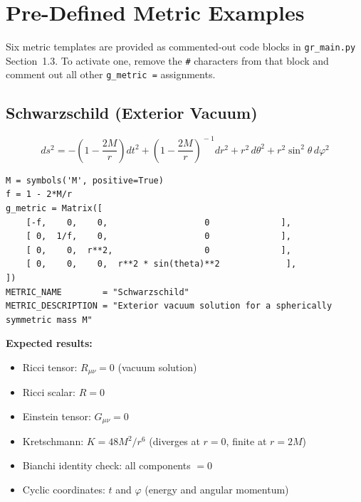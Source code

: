 \documentclass[11pt,a4paper]{article}
\newcommand{\code}[1]{\texttt{\small#1}}
\begin{document}
\section{Pre-Defined Metric Examples}
\label{sec:metrics}

Six metric templates are provided as commented-out code blocks in
\code{gr\_main.py} Section~1.3.  To activate one, remove the \code{\#}
characters from that block and comment out all other \code{g\_metric =}
assignments.

\subsection{Schwarzschild (Exterior Vacuum)}
\label{sec:m-schwarz}

\[
  ds^2 = -\!\left(1-\frac{2M}{r}\right)dt^2
         + \left(1-\frac{2M}{r}\right)^{\!-1}dr^2
         + r^2\,d\theta^2 + r^2\sin^2\!\theta\,d\varphi^2
\]

\begin{lstlisting}
M = symbols('M', positive=True)
f = 1 - 2*M/r
g_metric = Matrix([
    [-f,    0,    0,                   0              ],
    [ 0,  1/f,    0,                   0              ],
    [ 0,    0,  r**2,                  0              ],
    [ 0,    0,    0,  r**2 * sin(theta)**2             ],
])
METRIC_NAME        = "Schwarzschild"
METRIC_DESCRIPTION = "Exterior vacuum solution for a spherically symmetric mass M"
\end{lstlisting}

\textbf{Expected results:}
\begin{itemize}
  \item Ricci tensor: $R_{\mu\nu} = 0$ (vacuum solution)
  \item Ricci scalar: $R = 0$
  \item Einstein tensor: $G_{\mu\nu} = 0$
  \item Kretschmann: $K = 48M^2/r^6$ (diverges at $r=0$, finite at $r=2M$)
  \item Bianchi identity check: all components $= 0$
  \item Cyclic coordinates: $t$ and $\varphi$ (energy and angular momentum)
\end{itemize}
\end{document}
